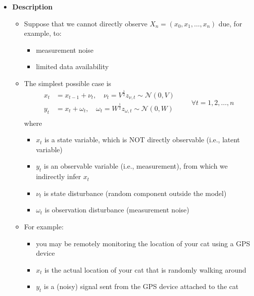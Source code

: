 \documentclass[12pt,a4paper]{article}
\begin{document}
\begin{itemize}

\item \textbf{Description}

  \begin{itemize}

  \item Suppose that we cannot directly observe $X_{n}=(x_{0},x_{1},\ldots, x_{n})$ due, for example, to:
    \begin{itemize}
    \item measurement noise
    \item limited data availability
    \end{itemize}
  \item The simplest possible case is
    \begin{equation}\label{eq:model_local}%
      \begin{aligned}
        x_{t} & = x_{t-1} + \nu_{t}, \quad \nu_{t}=V^{\frac{1}{2}}z_{\nu,t} \sim \mathcal{N}(0,V) \\
        y_{t} & =  x_{t} + \omega_{t}, \quad \omega_{t}=W^{\frac{1}{2}}z_{\omega,t} \sim \mathcal{N}(0,W) \\
      \end{aligned}
      \qquad \forall t = 1, 2, \ldots, n
    \end{equation}
    where
    \begin{itemize}
    \item $x_{t}$ is a state variable, which is NOT directly observable (i.e., latent variable)
    \item $y_{t}$ is an observable variable (i.e., measurement), from which we indirectly infer $x_{t}$
    \item $\nu_{t}$ is state disturbance (random component outside the model)
    \item $\omega_{t}$ is observation disturbance (measurement noise)
    \end{itemize}

  \item For example:
    \begin{itemize}
    \item you may be remotely monitoring the location of your cat using a GPS device
    \item $x_{t}$ is the actual location of your cat that is randomly walking around
    \item $y_{t}$ is a (noisy) signal sent from the GPS device attached to the cat
    \end{itemize}


\end{itemize}
\end{itemize}
\end{document}
